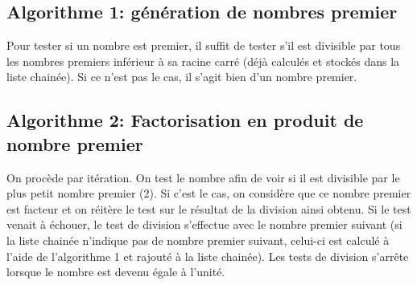 \documentclass[11pt,a4paper]{article}
\begin{document}
 \subsection{Algorithme 1: génération de nombres premier}
 
Pour tester si un nombre est premier, il suffit de tester s'il est divisible par tous les nombres premiers inférieur à sa racine carré (déjà calculés et stockés dans la liste chainée). Si ce n'est pas le cas, il s'agit bien d'un nombre premier. 
 
 
 \subsection*{Algorithme 2: Factorisation en produit de nombre premier}   
 
 On procède par itération. On test le nombre afin de voir si il est divisible par le plus petit nombre premier (2). Si c'est le cas, on considère que ce nombre premier est facteur et on réitère le test sur le résultat de la division ainsi obtenu. Si le test venait à échouer, le test de division s'effectue avec le nombre premier suivant (si la liste chainée n'indique pas de nombre premier suivant, celui-ci est calculé à l'aide de l'algorithme 1 et rajouté à la liste chainée). Les tests de division s'arrête lorsque le nombre est devenu égale à l'unité.
\end{document}
